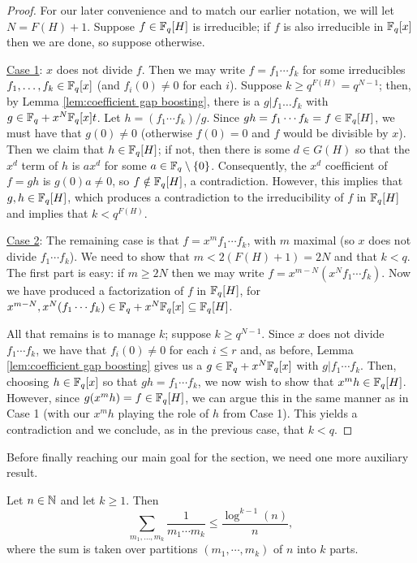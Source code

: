 \begin{proof}
	For our later convenience and to match our earlier notation, we will let $N = F(H)+1$.
	Suppose $f\in \mathbb{F}_q[H]$ is irreducible; if $f$ is also irreducible in $\mathbb{F}_q[x]$ then we are done, so suppose otherwise.  
	
	\underline{Case 1}: $x$ does not divide $f$.
	Then we may write $f = f_1\cdots f_k$ for some irreducibles $f_1,\dots,f_k\in \mathbb{F}_q[x]$ (and $f_i(0)\neq0$ for each $i$).
	Suppose $k\ge q^{F(H)} = q^{N-1}$; then, by Lemma \ref{lem:coefficient gap boosting}, there is a $g|f_1\dots f_k$ with $g\in \mathbb{F}_q+x^N \mathbb{F}_q[x]t$.
	Let $h = (f_1\cdots f_k)/g$.
	Since $gh = f_1\cdots f_k = f \in \mathbb{F}_q[H]$, we must have that $g(0) \neq 0$ (otherwise $f(0)=0$ and $f$ would be divisible by $x$).
	Then we claim that $h\in \mathbb{F}_q[H]$; if not, then there is some $d\in G(H)$ so that the $x^d$ term of $h$ is $a x^d$ for some $a\in \mathbb{F}_q\setminus\{0\}$.
	Consequently, the $x^d$ coefficient of $f = gh$ is $g(0)a \neq 0$, so $f\notin \mathbb{F}_q[H]$, a contradiction.
	However, this implies that $g,h\in \mathbb{F}_q[H]$, which produces a contradiction to the irreducibility of $f$ in $\mathbb{F}_q[H]$ and implies that $k < q^{F(H)}$.
	
	\underline{Case 2}: The remaining case is that $f = x^m f_1\cdots f_k$, with $m$ maximal (so $x$ does not divide $f_1\cdots f_k$).
	We need to show that $m<2(F(H)+1) = 2N$ and that $k<q$.
	The first part is easy: if $m\ge 2N$ then we may write $f = x^{m-N} (x^N f_1\cdots f_k)$.
	Now we have produced a factorization of $f$ in $\mathbb{F}_q[H]$, for $x^{m-N}, x^N (f_1\cdots f_k) \in \mathbb{F}_q + x^N \mathbb{F}_q[x] \subseteq \mathbb{F}_q[H]$.
	
	All that remains is to manage $k$; suppose $k \ge q^{N-1}$.
	Since $x$ does not divide $f_1 \cdots f_k$, we have that $f_i(0) \neq 0$ for each $i\le r$ and, as before, Lemma \ref{lem:coefficient gap boosting} gives us a $g\in \mathbb{F}_q+x^N \mathbb{F}_q[x]$ with $g|f_1\cdots f_k$.
	Then, choosing $h\in \mathbb{F}_q[x]$ so that $gh = f_1\cdots f_k$, we now wish to show that $x^m h \in \mathbb{F}_q[H]$.
	However, since $g (x^m h) = f \in \mathbb{F}_q[H]$, we can argue this in the same manner as in Case 1 (with our $x^m h$ playing the role of $h$ from Case 1).
	This yields a contradiction and we conclude, as in the previous case, that $k< q$.
\end{proof}

Before finally reaching our main goal for the section, we need one more auxiliary result.

\begin{lemma}\label{lem:srpp log bound}
	Let $n\in \mathbb{N}$ and let $k\ge 1$. 
	Then
	\[\sum_{m_1,\dots,m_k} \frac{1}{m_1\cdots m_k} \le \frac{\log^{k-1}(n)}{n}, \]
	where the sum is taken over partitions $(m_1,\cdots,m_k)$ of $n$ into $k$ parts.
\end{lemma}

